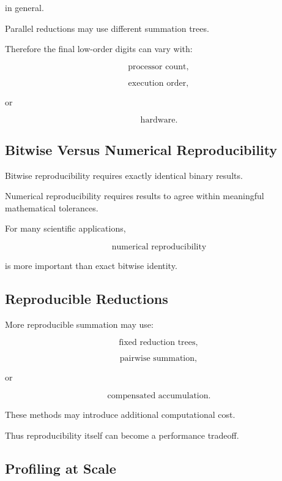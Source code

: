 in general.

Parallel reductions may use different summation trees.

Therefore the final low-order digits can vary with:

\[
\boxed{
\text{processor count},
}
\]

\[
\boxed{
\text{execution order},
}
\]

or

\[
\boxed{
\text{hardware}.
}
\]

\subsection{Bitwise Versus Numerical Reproducibility}
\label{subsec:hpmc-bitwise-numerical-reproducibility}

Bitwise reproducibility requires exactly identical binary results.

Numerical reproducibility requires results to agree within meaningful
mathematical tolerances.

For many scientific applications,

\[
\boxed{
\text{numerical reproducibility}
}
\]

is more important than exact bitwise identity.

\subsection{Reproducible Reductions}
\label{subsec:reproducible-reductions}

More reproducible summation may use:

\[
\boxed{
\text{fixed reduction trees},
}
\]

\[
\boxed{
\text{pairwise summation},
}
\]

or

\[
\boxed{
\text{compensated accumulation}.
}
\]

These methods may introduce additional computational cost.

Thus reproducibility itself can become a performance tradeoff.

\subsection{Profiling at Scale}
\label{subsec:hpmc-profiling}

